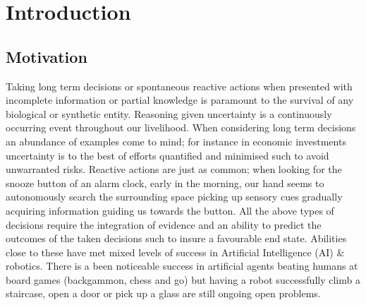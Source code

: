 \chapter{Introduction}

\section{Motivation}
% 
%
%
%
%

%
%
%
%


%
%
%
%
%
%

Taking long term decisions or spontaneous reactive actions when presented with incomplete information or partial knowledge is 
paramount to the survival of any biological or synthetic entity. Reasoning given uncertainty is a continuously occurring event throughout our 
livelihood. When considering long term decisions an abundance of examples come to mind; for instance in economic investments 
uncertainty is to the best of efforts quantified and minimised such to avoid unwarranted risks. Reactive actions are just as common; 
when looking for the snooze button of an alarm clock, early in the morning, our hand seems to autonomously search the surrounding space picking up
sensory cues gradually acquiring information guiding us towards the button. All the above types of decisions require the integration of 
evidence and an ability to predict the outcomes of the taken decisions such to insure a favourable end state. 
Abilities close to these have met mixed levels of success in Artificial Intelligence (AI) \& robotics. There is a been 
noticeable success in artificial agents beating humans at board games (backgammon, chess and go) but having a robot successfully 
climb a staircase, open a door or pick up a glass are still ongoing open problems. 

